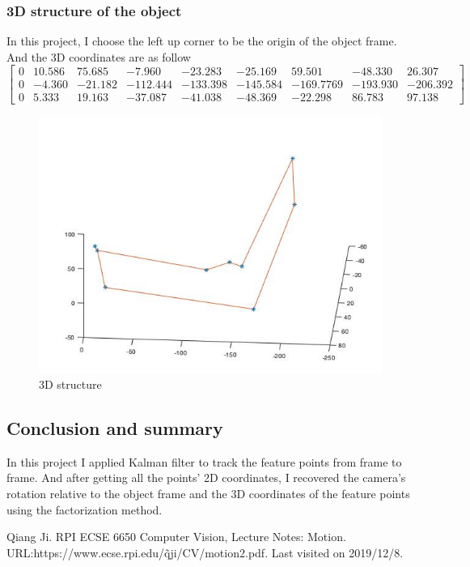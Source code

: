 \documentclass{article}
\begin{document}
\subsubsection*{3D structure of the object}
\par 
In this project, I choose the left up corner to be the origin of the object frame. And the 3D coordinates are as follow
\begin{equation*}
\begin{bmatrix}
0&10.586&75.685&-7.960&-23.283&-25.169&59.501&-48.330&26.307\\
0&-4.360&-21.182&-112.444&-133.398&-145.584&-169.7769&-193.930&-206.392\\
0&5.333&19.163&-37.087&-41.038&-48.369&-22.298&86.783&97.138
\end{bmatrix}
\end{equation*} 
\begin{figure}[H]
\centering
\includegraphics[scale=0.5]{3D_structure.jpg}
\caption{3D structure}
\label{fig:label}
\end{figure}
\subsection*{Conclusion and summary}
In this project I applied Kalman filter to track the feature points from frame to frame. And after getting all the points' 2D coordinates, I recovered the camera's rotation relative to the object frame and the 3D coordinates of the feature points using the factorization method.

\newpage

\begin{thebibliography}{}  
Qiang Ji. RPI ECSE 6650 Computer Vision, Lecture Notes: Motion. URL:https://www.ecse.rpi.edu/\~qji/CV/motion2.pdf. Last visited on 2019/12/8.
\end{thebibliography}
\end{document}
